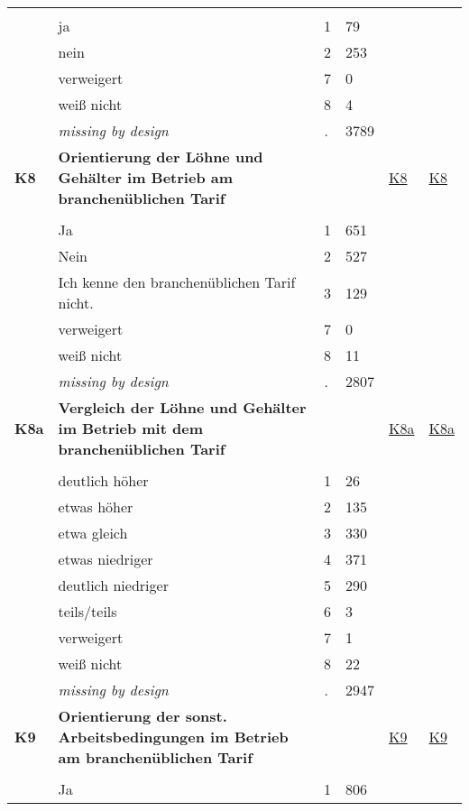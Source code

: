 \begin{longtable}{| L{2.45cm} | L{6cm} | C{1.5cm} | R{1cm} | C{2.25cm} | C{2.25cm} |}
   &  &  &  &  &  \\ 
   & ja & 1 & 79 &  &  \\ 
   & nein & 2 & 253 &  &  \\ 
   & verweigert & 7 & 0 &  &  \\ 
   & weiß nicht & 8 & 4 &  &  \\ 
   & \textit{missing by design} & \textit{.} & 3789 &  &  \\ 
   \midrule
\textbf{K8}\label{var:K8} & \textbf{Orientierung der Löhne und Gehälter im Betrieb am branchenüblichen Tarif} &  &  & \hyperref[K8]{K8} & \hyperref[var:suf:K8]{K8} \\ 
   &  &  &  &  &  \\ 
   & Ja & 1 & 651 &  &  \\ 
   & Nein & 2 & 527 &  &  \\ 
   & Ich kenne den branchenüblichen Tarif nicht. & 3 & 129 &  &  \\ 
   & verweigert & 7 & 0 &  &  \\ 
   & weiß nicht & 8 & 11 &  &  \\ 
   & \textit{missing by design} & \textit{.} & 2807 &  &  \\ 
   \midrule
\textbf{K8a}\label{var:K8a} & \textbf{Vergleich der Löhne und Gehälter im Betrieb mit dem branchenüblichen Tarif} &  &  & \hyperref[K8a]{K8a} & \hyperref[var:suf:K8a]{K8a} \\ 
   &  &  &  &  &  \\ 
   & deutlich höher & 1 & 26 &  &  \\ 
   & etwas höher & 2 & 135 &  &  \\ 
   & etwa gleich & 3 & 330 &  &  \\ 
   & etwas niedriger & 4 & 371 &  &  \\ 
   & deutlich niedriger & 5 & 290 &  &  \\ 
   & teils/teils & 6 & 3 &  &  \\ 
   & verweigert & 7 & 1 &  &  \\ 
   & weiß nicht & 8 & 22 &  &  \\ 
   & \textit{missing by design} & \textit{.} & 2947 &  &  \\ 
   \midrule
\textbf{K9}\label{var:K9} & \textbf{Orientierung der sonst. Arbeitsbedingungen im Betrieb am branchenüblichen Tarif} &  &  & \hyperref[K9]{K9} & \hyperref[var:suf:K9]{K9} \\ 
   &  &  &  &  &  \\ 
   & Ja & 1 & 806 &  &  \\ 

\end{longtable}
